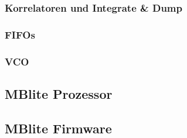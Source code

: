\subsubsection{Korrelatoren und Integrate \& Dump}

\subsubsection{FIFOs}

\label{ImplMemoryMapTrackingloop}
\subsubsection{VCO}\label{VCOimplementierung}

\subsection{MBlite Prozessor}
\subsection{MBlite Firmware}
